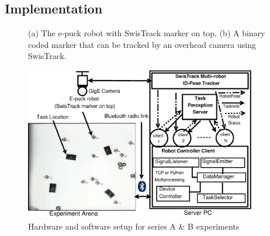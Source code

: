 \documentclass[final,5p,times,twocolumn]{elsarticle}
\begin{document}
\subsection{Implementation}
\label{afm:impl}
\begin{figure}
\centering
{} 
\hspace{0.5cm}
\caption{(a) The e-puck robot with SwisTrack marker on top, (b) A binary coded marker that can be tracked by an overhead camera  using SwisTrack.}
\label{fig:e-puck}
\end{figure}
\begin{figure}
\centering
\includegraphics[width=0.9\textwidth, angle=0]
{./images/RIL-Expt-Setup1.eps}
\caption{Hardware and software setup for series A \& B experiments}
\label{fig:RIL-Expt-Setup1} %
\end{figure}
\end{document}

